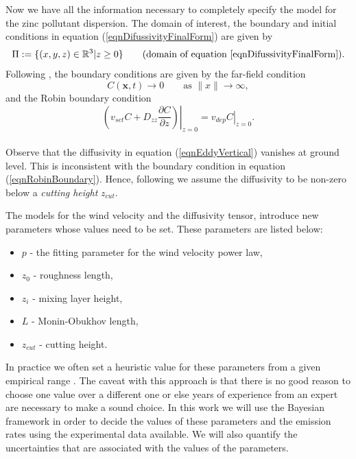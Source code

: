 \documentclass{sfuthesis}
\newcommand{\x}{\textbf{x}}
\begin{document}
Now we have all the information necessary to completely specify the model for the zinc pollutant dispersion. The domain of interest, 
the   boundary and initial  conditions in equation (\ref{eqnDifussivityFinalForm}) are given by
\begin{equation*}
\Pi:=\{(x,y,z)\in\mathbb{R}^{3}|z\geq 0\}\qquad\text{(domain of equation \eqref{eqnDifussivityFinalForm})}.
\end{equation*}
Following \cite{hosseini2016airborne}, the boundary conditions are given by the far-field condition
\begin{equation*}
C(\x,t)\rightarrow 0\qquad\text{as   }\|x\|\rightarrow\infty,
\end{equation*}
and the Robin boundary condition
\begin{equation}\label{eqnRobinBoundary}
\left.\left(v_{set}C+D_{zz}\frac{\partial C}{\partial z}\right)\right\rvert_{z=0}=\left.v_{dep}C\right\rvert_{z=0}.
\end{equation} 
\\

Observe that the  diffusivity  in equation (\ref{eqnEddyVertical}) vanishes
at  ground level. This is inconsistent with the boundary condition in equation (\ref{eqnRobinBoundary}).
Hence, following \cite{hosseini2016airborne} we assume the diffusivity  to be non-zero below a \textit{cutting height} $z_{cut}$.


The models for the wind velocity and the  
diffusivity tensor, introduce new parameters whose values need to be set. These
parameters are listed below:
\begin{itemize}
\item $p$ - the fitting parameter for the wind velocity power law,
\item $z_{0}$ - roughness length,
\item $z_{i}$ - mixing layer height,
\item $L$ - Monin-Obukhov length,
\item $z_{cut}$ - cutting height.
\end{itemize}
In practice we often set a heuristic value for these parameters from a given empirical range \cite{seinfeld1998atmospheric,hosseini2016airborne}.
The caveat with this approach is that there is no good reason to choose one value
over a different one or else  years of experience from an expert are necessary to make a  sound choice. 
In this work we will  use the Bayesian framework in order 
to decide the values of these parameters and the emission rates using the experimental data available. We will 
also quantify the uncertainties that are associated with the values of the parameters.
\end{document}
